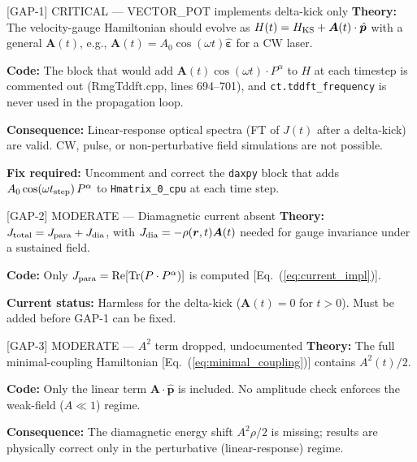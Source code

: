 \documentclass[12pt,letterpaper]{article}
\begin{document}
\begin{gapbox}[label=gap:cw]{[GAP-1] CRITICAL --- VECTOR\_POT implements delta-kick only}
\textbf{Theory:} The velocity-gauge Hamiltonian should evolve as
$H(t) = H_{\rm KS} + \bm{A}(t)\cdot\hat{\bm{p}}$ with a general $\bm{A}(t)$,
e.g., $\bm{A}(t)=A_0\cos(\omega t)\hat{\bm{\varepsilon}}$ for a CW laser.

\textbf{Code:} The block that would add $\bm{A}(t)\cos(\omega t)\cdot P^\alpha$
to $H$ at each timestep is commented out (RmgTddft.cpp, lines 694--701), and
\texttt{ct.tddft\_frequency} is never used in the propagation loop.

\textbf{Consequence:} Linear-response optical spectra (FT of $J(t)$ after a
delta-kick) are valid.  CW, pulse, or non-perturbative field simulations are
not possible.

\textbf{Fix required:} Uncomment and correct the \texttt{daxpy} block that
adds $A_0\cos(\omega t_{\rm step})\,P^\alpha$ to \texttt{Hmatrix\_0\_cpu} at
each time step.
\end{gapbox}

\begin{gapboxmod}{[GAP-2] MODERATE --- Diamagnetic current absent}
\textbf{Theory:} $J_{\rm total} = J_{\rm para} + J_{\rm dia}$, with
$J_{\rm dia} = -\rho(\bm{r},t)\bm{A}(t)$ needed for gauge invariance under a
sustained field.

\textbf{Code:} Only $J_{\rm para} = \operatorname{Re}[\operatorname{Tr}(P\cdot P^\alpha)]$
is computed [Eq.~(\ref{eq:current_impl})].

\textbf{Current status:} Harmless for the delta-kick ($\bm{A}(t)=0$ for $t>0$).
Must be added before GAP-1 can be fixed.
\end{gapboxmod}

\begin{gapboxmod}[label=gap:A2]{[GAP-3] MODERATE --- $A^2$ term dropped, undocumented}
\label{gap:A2}
\textbf{Theory:} The full minimal-coupling Hamiltonian [Eq.~(\ref{eq:minimal_coupling})]
contains $A^2(t)/2$.

\textbf{Code:} Only the linear term $\bm{A}\cdot\hat{\bm{p}}$ is included.
No amplitude check enforces the weak-field ($A\ll 1$) regime.

\textbf{Consequence:} The diamagnetic energy shift $A^2\rho/2$ is missing;
results are physically correct only in the perturbative (linear-response) regime.
\end{gapboxmod}
\end{document}
